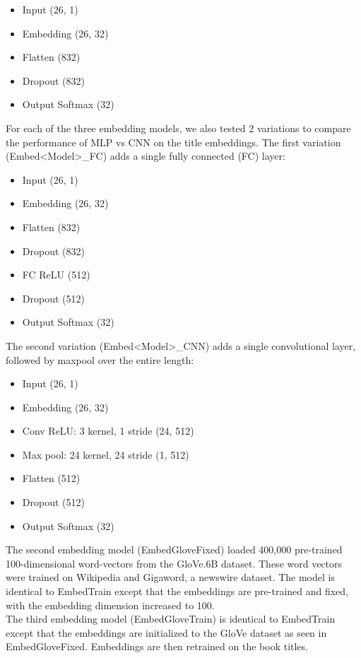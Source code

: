 \documentclass[jou,apacite, 10px]{apa6}
\begin{document}
\begin{itemize}
    \item Input (26, 1)
    \item Embedding (26, 32)
    \item Flatten (832)
    \item Dropout (832)
    \item Output Softmax (32)
\end{itemize}
For each of the three embedding models, we also tested 2 variations to compare the performance of MLP vs CNN on the title embeddings. The first variation (Embed<Model>\_FC) adds a single fully connected (FC) layer:\\
\begin{itemize}
    \item Input (26, 1)
    \item Embedding (26, 32)
    \item Flatten (832)
    \item Dropout (832)
    \item FC ReLU (512)
    \item Dropout (512)
    \item Output Softmax (32)
\end{itemize}\rule{0pt}{4ex}
The second variation (Embed<Model>\_CNN) adds a single convolutional layer, followed by maxpool over the entire length:

\begin{itemize}
    \item Input (26, 1)
    \item Embedding (26, 32)
    \item Conv ReLU: 3 kernel, 1 stride (24, 512)
    \item Max pool: 24 kernel, 24 stride (1, 512)
    \item Flatten (512)
    \item Dropout (512)
    \item Output Softmax (32)
\end{itemize}
The second embedding model (EmbedGloveFixed) loaded 400,000 pre-trained 100-dimensional word-vectors from the GloVe.6B dataset. These word vectors were trained on Wikipedia and Gigaword, a newswire dataset. The model is identical to EmbedTrain except that the embeddings are pre-trained and fixed, with the embedding dimension increased to 100.\\
The third embedding model (EmbedGloveTrain) is identical to EmbedTrain except that the embeddings are initialized to the GloVe dataset as seen in EmbedGloveFixed. Embeddings are then retrained on the book titles.\\
\end{document}

